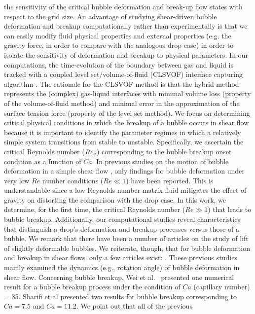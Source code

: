 \documentclass{elsarticle}
\begin{document}
{the sensitivity of the critical bubble deformation and break-up flow states with respect to the grid size.  An advantage of studying shear-driven 
bubble deformation and breakup computationally rather than experimentally is that we can easily modify fluid physical properties and external properties (e.g. the gravity force, in order to compare with the analogous drop case) in order to isolate
the sensitivity of deformation and breakup to physical parameters.  In our computations, the time-evolution of the boundary 
between gas and liquid is tracked with a coupled level set/volume-of-fluid (CLSVOF) interface capturing algorithm \cite{SusPuc00,SusSmiHusOhtZhi07}.  The rationale for the CLSVOF method is that the hybrid method represents the (complex) gas-liquid interfaces with minimal volume loss (property of the volume-of-fluid method) and minimal error in the approximation of the surface tension force (property of the level set method).
We focus on determining critical physical conditions in which the breakup of a bubble occurs in shear flow because it is important to identify 
the parameter regimes in which a relatively simple system transitions from stable to unstable.  Specifically, we ascertain the critical 
Reynolds number ($Re_{\rm c}$) corresponding to the bubble breakup onset condition as a function of $Ca$.          
%
In previous studies on the motion of bubble deformation in a simple shear flow \cite{RusMan02, MulTobDreFisWin08}, only findings 
for bubble deformation under very low $Re$ number conditions ($Re \ll 1$) have been reported.  This is understandable since a low Reynolds number matrix fluid mitigates the effect of gravity on distorting the comparison with the drop case.  In this work, we determine, for the 
first time, the critical Reynolds number ($Re \gg 1$) that leads to bubble breakup.  Additionally, our computational studies 
reveal characteristics that distinguish a drop's deformation and breakup processes versus those of a bubble.
%
We remark that there have been a number of articles on the study of lift of slightly deformable bubbles\cite{ErvinANDTryggvason1997,legendre1998lift}.  
We reiterate, though, that for bubble deformation and breakup in shear flows, only a few articles exist: \cite{WeiQiaXu12,WanShiZha15,AAMM-16-2}.
These previous studies mainly examined the dynamics (e.g., rotation angle) of bubble deformation in shear flow.
Concerning bubble breakup, Wei et al.~\cite{WeiQiaXu12} presented one numerical result for a bubble breakup process under the condition of $Ca$ (capillary number) = 35. Sharifi et al\cite{AAMM-16-2} presented two results for bubble breakup corresponding to $Ca=7.5$ and $Ca=11.2$.  We point out that all of the previous
}
\end{document}
